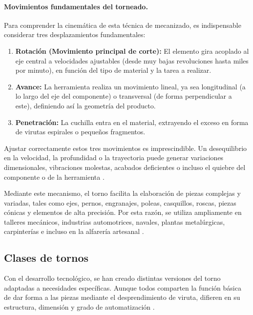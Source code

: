 \documentclass[12pt,a4paper]{article}
\begin{document}
\paragraph{Movimientos fundamentales del torneado.}
Para comprender la cinemática de esta técnica de mecanizado, es indispensable considerar tres desplazamientos fundamentales:
\begin{enumerate}[itemsep=2pt, topsep=2pt, parsep=0pt]
    \item \textbf{Rotación (Movimiento principal de corte):} El elemento gira acoplado al eje central a velocidades ajustables (desde muy bajas revoluciones hasta miles por minuto), en función del tipo de material y la tarea a realizar.
    \item \textbf{Avance:} La herramienta realiza un movimiento lineal, ya sea longitudinal (a lo largo del eje del componente) o transversal (de forma perpendicular a este), definiendo así la geometría del producto.
    \item \textbf{Penetración:} La cuchilla entra en el material, extrayendo el exceso en forma de virutas espirales o pequeños fragmentos.
\end{enumerate}

Ajustar correctamente estos tres movimientos es imprescindible. Un desequilibrio en la velocidad, la profundidad o la trayectoria puede generar variaciones dimensionales, vibraciones molestas, acabados deficientes o incluso el quiebre del componente o de la herramienta \cite{altintas2012}.

Mediante este mecanismo, el torno facilita la elaboración de piezas complejas y variadas, tales como ejes, pernos, engranajes, poleas, casquillos, roscas, piezas cónicas y elementos de alta precisión. Por esta razón, se utiliza ampliamente en talleres mecánicos, industrias automotrices, navales, plantas metalúrgicas, carpinterías e incluso en la alfarería artesanal \cite{groover2020}.

\subsection{Clases de tornos}
\label{subsec:clases_tornos}
Con el desarrollo tecnológico, se han creado distintas versiones del torno adaptadas a necesidades específicas. Aunque todos comparten la función básica de dar forma a las piezas mediante el desprendimiento de viruta, difieren en su estructura, dimensión y grado de automatización \cite{kalpakjian2020}.
\end{document}
